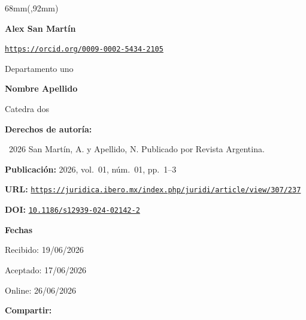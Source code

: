 \begin{textblock*}{68mm}(\gbbloquex,92mm)
{\setlength{\leftskip}{0pt}\setlength{\parindent}{0pt}%
\noindent\begin{minipage}[t]{68mm}
\sffamily\small\setlength{\parskip}{1pt}
{\bfseries\color{azulrevista}Alex San Martín}\par
{\scriptsize\texttt{\href{https://orcid.org/0009-0002-5434-2105}{https://orcid.org/0009-0002-5434-2105}}}\par
Departamento uno\par
\vspace{4pt}
{\bfseries\color{azulrevista}Nombre Apellido}\par
Catedra dos\par
\vspace{6pt}
{\bfseries\color{azulrevista!70}Derechos de autor\'ia:}\par
\textcopyright\ 2026 San Martín, A. y Apellido, N. Publicado por Revista Argentina. \par\vspace{6pt}
{\bfseries\color{azulrevista!70}Publicación:} 2026, vol.~01, n\'um.~01, pp.~1--3\par\vspace{6pt}
{\bfseries\color{azulrevista!70}URL:} {\scriptsize\texttt{\href{https://juridica.ibero.mx/index.php/juridi/article/view/307/237}{https://juridica.ibero.mx/index.php/juridi/article/view/307/237}}}\par\vspace{6pt}
{\bfseries\color{azulrevista!70}DOI:} {\scriptsize\texttt{\href{https://doi.org/10.1186/s12939-024-02142-2}{10.1186/s12939-024-02142-2}}}\par\vspace{6pt}
{\bfseries\color{azulrevista!70}Fechas}\par\vspace{2pt}
Recibido: 19/06/2026\par
Aceptado: 17/06/2026\par
Online: 26/06/2026\par
\vspace{6pt}
\vspace{6pt}
{\bfseries\color{azulrevista!70}Compartir:}\par\vspace{3pt}
{\large
\href{https://bsky.app/intent/compose?text=https%3A%2F%2Fjuridica.ibero.mx%2Findex.php%2Fjuridi%2Farticle%2Fview%2F307%2F237}{}~
}
\end{minipage}}
\end{textblock*}
